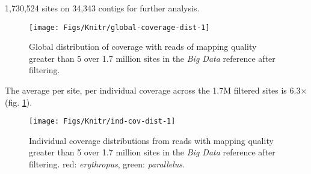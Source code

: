 \documentclass[a4paper,12pt,times,authoryear,twoside,print,index]{Classes/PhDThesisPSnPDF}\usepackage[]{graphicx}\usepackage[]{color}
\newenvironment{knitrout}{}{} %
\begin{document}
1,730,524 sites on 34,343 contigs for further analysis.
%
\begin{figure}[htb]
\centering
\begin{knitrout}
\color{fgcolor}

{\centering \texttt{[image: Figs/Knitr/global-coverage-dist-1]} 

}



\end{knitrout}
\caption{Global distribution of coverage with reads of mapping quality greater than 5 over 1.7 million sites in the \emph{Big Data} reference after filtering.}
\label{Fig:global-coverage-dist}
\end{figure}
%
The average per site, per individual coverage across the 1.7M filtered sites is 6.3$\times$ (fig. \ref{Fig:global-coverage-dist}).
%
\begin{figure}[htb]
\centering
\begin{knitrout}
\color{fgcolor}

{\centering \texttt{[image: Figs/Knitr/ind-cov-dist-1]} 

}



\end{knitrout}
\caption{Individual coverage distributions from reads with mapping quality greater than 5 over 1.7 million sites in the \emph{Big Data} reference after filtering. red: \textit{erythropus}, green: \textit{parallelus}.}
\label{Fig:individual-coverage-dist}
\end{figure}
%

%
%
\end{document}
